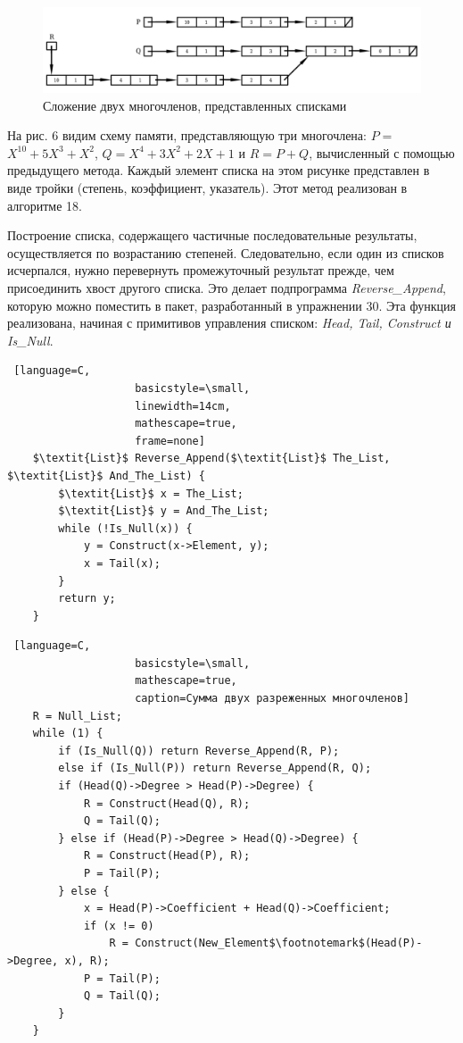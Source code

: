 \documentclass{../../template/mai_book}
\begin{document}
\renewcommand{\figurename}{Рис}
\setcounter{figure}{5}

\begin{figure}[htp]
\centering
\begin{framed}
\includegraphics[width=12cm]{./img/Pic6.png}
\end{framed}
\caption{Сложение двух многочленов, представленных списками}
\end{figure}

\renewcommand{\figurename}{Алгоритм}

\newpage


На рис. 6 видим схему памяти, представляющую три многочлена: $P =$ \linebreak $X^{10} + 5X^3 + X^2$, $Q = X^4 + 3X^2 + 2X + 1$ и $R = P + Q$, вычисленный с помощью предыдущего метода. Каждый элемент списка на этом рисунке представлен в виде тройки (степень, коэффициент, указатель). Этот метод реализован в алгоритме 18.

Построение списка, содержащего частичные последовательные результаты, осуществляется по возрастанию степеней. Следовательно, если один из списков исчерпался, нужно перевернуть промежуточный результат \linebreak прежде, чем присоединить хвост другого списка. Это делает подпрограмма \textit{Reverse\_Append}, которую можно поместить в пакет, разработанный в \linebreak упражнении 30. Эта функция реализована, начиная с примитивов управления списком: \textit{Head, Tail, Construct и Is\_Null}.

\begin{lstlisting} [language=C,
					basicstyle=\small,
					linewidth=14cm,
					mathescape=true,
					frame=none]
	$\textit{List}$ Reverse_Append($\textit{List}$ The_List, $\textit{List}$ And_The_List) {
		$\textit{List}$ x = The_List;
		$\textit{List}$ y = And_The_List;
		while (!Is_Null(x)) {
			y = Construct(x->Element, y);
			x = Tail(x);
		}
		return y;
	}
\end{lstlisting}

\begin{lstlisting} [language=C,
					basicstyle=\small,
					mathescape=true,
					caption=Сумма двух разреженных многочленов]
	R = Null_List;
	while (1) {
		if (Is_Null(Q)) return Reverse_Append(R, P);
		else if (Is_Null(P)) return Reverse_Append(R, Q);
		if (Head(Q)->Degree > Head(P)->Degree) {
			R = Construct(Head(Q), R);
			Q = Tail(Q);
		} else if (Head(P)->Degree > Head(Q)->Degree) {
			R = Construct(Head(P), R);
			P = Tail(P);
		} else {
			x = Head(P)->Coefficient + Head(Q)->Coefficient;
			if (x != 0)
				R = Construct(New_Element$\footnotemark$(Head(P)->Degree, x), R);
			P = Tail(P);
			Q = Tail(Q);
		}
	}
\end{lstlisting}
\end{document}
